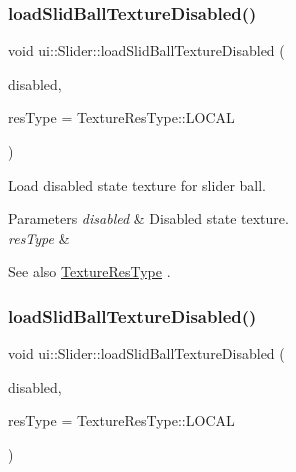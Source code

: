 \subsubsection{\texorpdfstring{load\+Slid\+Ball\+Texture\+Disabled()}{loadSlidBallTextureDisabled()}\hspace{0.1cm}{\footnotesize\ttfamily [1/2]}}
{\footnotesize\ttfamily void ui\+::\+Slider\+::load\+Slid\+Ball\+Texture\+Disabled (\begin{DoxyParamCaption}\item[{const std\+::string \&}]{disabled,  }\item[{\hyperlink{classui_1_1Widget_a040a65ec5ad3b11119b7e16b98bd9af0}{Texture\+Res\+Type}}]{res\+Type = {\ttfamily TextureResType\+:\+:LOCAL} }\end{DoxyParamCaption})}

Load disabled state texture for slider ball.


\begin{DoxyParams}{Parameters}
{\em disabled} & Disabled state texture. \\
\hline
{\em res\+Type} & \\
\hline
\end{DoxyParams}
\begin{DoxySeeAlso}{See also}
\hyperlink{classui_1_1Widget_a040a65ec5ad3b11119b7e16b98bd9af0}{Texture\+Res\+Type} . 
\end{DoxySeeAlso}
\mbox{\label{classui_1_1Slider_a6d4531a15ed308e060d681ef99d97ce0}} 
\subsubsection{\texorpdfstring{load\+Slid\+Ball\+Texture\+Disabled()}{loadSlidBallTextureDisabled()}\hspace{0.1cm}{\footnotesize\ttfamily [2/2]}}
{\footnotesize\ttfamily void ui\+::\+Slider\+::load\+Slid\+Ball\+Texture\+Disabled (\begin{DoxyParamCaption}\item[{const std\+::string \&}]{disabled,  }\item[{\hyperlink{classui_1_1Widget_a040a65ec5ad3b11119b7e16b98bd9af0}{Texture\+Res\+Type}}]{res\+Type = {\ttfamily TextureResType\+:\+:LOCAL} }\end{DoxyParamCaption})}

